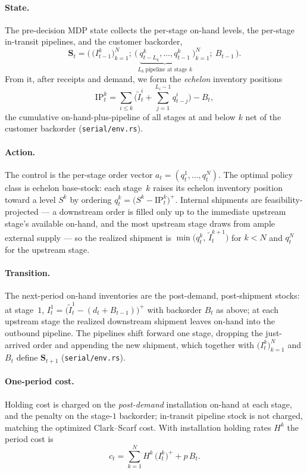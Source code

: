 \paragraph{State.}
The pre-decision MDP state collects the per-stage on-hand levels, the per-stage in-transit pipelines,
and the customer backorder,
\begin{equation*}
  \mathbf S_t = \Big(\, \big(I^k_{t-1}\big)_{k=1}^{N};\
  \big(\underbrace{q^k_{t-L_k},\dots,q^k_{t-1}}_{L_k\ \text{pipeline at stage }k}\big)_{k=1}^{N};\
  B_{t-1} \,\Big).
\end{equation*}
From it, after receipts and demand, we form the \emph{echelon} inventory positions
\begin{equation*}
  \mathrm{IP}^k_t = \sum_{i\le k}\Big(\widetilde I^i_t + \!\!\sum_{j=1}^{L_i-1}\! q^i_{t-j}\Big) - B_t,
\end{equation*}
the cumulative on-hand-plus-pipeline of all stages at and below $k$ net of the customer backorder
(\texttt{serial/env.rs}).

\paragraph{Action.}
The control is the per-stage order vector $a_t=(q^1_t,\dots,q^N_t)$. The optimal policy class is
echelon base-stock: each stage~$k$ raises its echelon inventory position toward a level $S^k$ by
ordering $q^k_t=\big(S^k-\mathrm{IP}^k_t\big)^+$. Internal shipments are feasibility-projected --- a
downstream order is filled only up to the immediate upstream stage's available on-hand, and the most
upstream stage draws from ample external supply --- so the realized shipment is
$\min\!\big(q^k_t,\,\widetilde I^{k+1}_t\big)$ for $k<N$ and $q^N_t$ for the upstream stage.

\paragraph{Transition.}
The next-period on-hand inventories are the post-demand, post-shipment stocks: at stage~$1$,
$I^1_t=\big(\widetilde I^1_t-(d_t+B_{t-1})\big)^+$ with backorder $B_t$ as above; at each upstream
stage the realized downstream shipment leaves on-hand into the outbound pipeline. The pipelines shift
forward one stage, dropping the just-arrived order and appending the new shipment, which together with
$\big(I^k_t\big)_{k=1}^{N}$ and $B_t$ define $\mathbf S_{t+1}$ (\texttt{serial/env.rs}).

\paragraph{One-period cost.}
Holding cost is charged on the \emph{post-demand} installation on-hand at each stage, and the penalty
on the stage-$1$ backorder; in-transit pipeline stock is not charged, matching the optimized
Clark--Scarf cost. With installation holding rates $H^k$ the period cost is
\begin{equation}
  c_t = \sum_{k=1}^{N} H^k\,\big(I^k_t\big)^+ + p\,B_t .
  \label{eq:serial-cost}
\end{equation}

